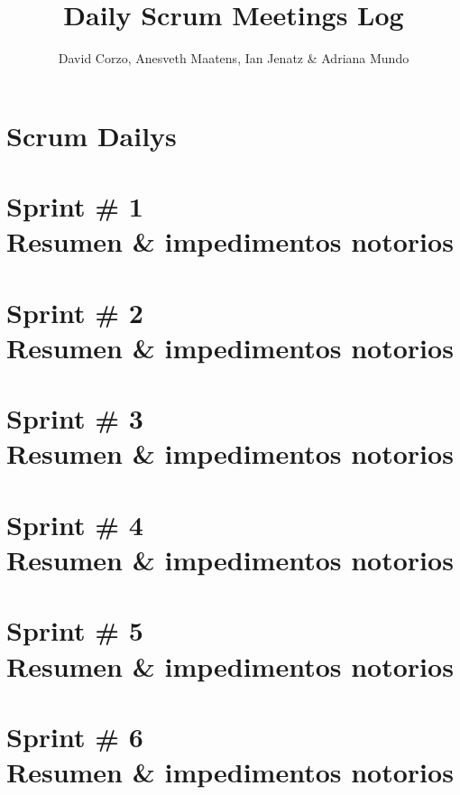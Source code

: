 \documentclass{book}
\title{Daily Scrum Meetings Log}
\author{David Corzo, Anesveth Maatens, Ian Jenatz \& Adriana Mundo}
\date{}
\begin{document}
\maketitle
\frontmatter 
\tableofcontents

\chapter{Scrum Dailys}


\mainmatter
\chapter{Sprint \# 1 \\ Resumen \& impedimentos notorios}


\chapter{Sprint \# 2 \\ Resumen \& impedimentos notorios}


\chapter{Sprint \# 3 \\ Resumen \& impedimentos notorios}


\chapter{Sprint \# 4 \\ Resumen \& impedimentos notorios}


\chapter{Sprint \# 5 \\ Resumen \& impedimentos notorios}


\chapter{Sprint \# 6 \\ Resumen \& impedimentos notorios}

\end{document}
